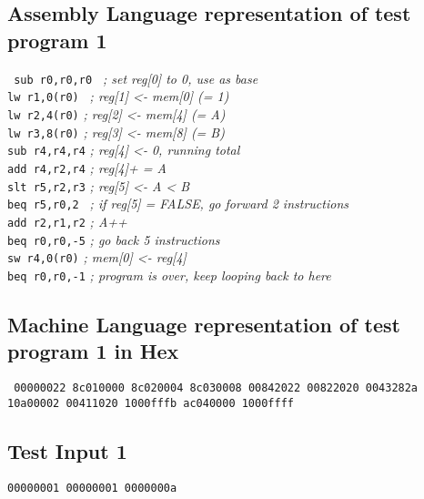 \documentclass[12pt]{report}
\begin{document}
\subsection*{Assembly Language representation of test program 1}
\texttt{
sub r0,r0,r0    } \textsl{; set reg[0] to 0, use as base } \\
\texttt{lw  r1,0(r0)   } \textsl{ ; reg[1] <- mem[0] (= 1) } \\
\texttt{lw  r2,4(r0)}    \textsl{ ; reg[2] <- mem[4] (= A)  }\\
\texttt{lw  r3,8(r0)}     \textsl{; reg[3] <- mem[8] (= B) }\\
\texttt{sub r4,r4,r4}     \textsl{; reg[4] <- 0, running total}\\  
\texttt{add r4,r2,r4}     \textsl{; reg[4]+ = A  }\\
\texttt{slt r5,r2,r3}     \textsl{; reg[5] <- A < B } \\
\texttt{beq r5,r0,2 }     \textsl{; if reg[5] = FALSE, go forward 2 instructions } \\
\texttt{add r2,r1,r2}     \textsl{; A++ } \\
\texttt{beq r0,r0,-5}     \textsl{; go back 5 instructions }\\
\texttt{sw  r4,0(r0)}     \textsl{; mem[0] <- reg[4] } \\
\texttt{beq r0,r0,-1}     \textsl{; program is over, keep looping back to here }\\
\subsection*{Machine Language representation of test program 1 in Hex}
\texttt{
00000022
8c010000
8c020004
8c030008
00842022
00822020
0043282a
10a00002
00411020
1000fffb
ac040000
1000ffff}
\subsection*{Test Input 1}
\texttt{00000001
00000001
0000000a
}
\end{document}
